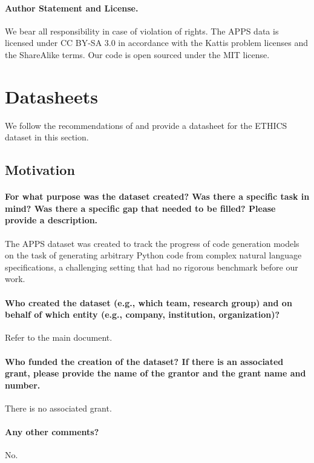 \paragraph{Author Statement and License.}
We bear all responsibility in case of violation of rights. The APPS data is licensed under CC BY-SA 3.0 in accordance with the Kattis problem licenses and the ShareAlike terms. Our code is open sourced under the MIT license.

\section{Datasheets}
We follow the recommendations of \citet{gebru2018datasheets} and provide a datasheet for the ETHICS dataset in this section.

\subsection{Motivation}

\paragraph{For what purpose was the dataset created? Was there a specific task
in mind? Was there a specific gap that needed to be filled? Please provide
a description.} 
The APPS dataset was created to track the progress of code generation models on the task of generating arbitrary Python code from complex natural language specifications, a challenging setting that had no rigorous benchmark before our work.

\paragraph{Who created the dataset (e.g., which team, research group) and on
behalf of which entity (e.g., company, institution, organization)?}
Refer to the main document.

\paragraph{Who funded the creation of the dataset? If there is an associated
grant, please provide the name of the grantor and the grant name and
number.}
There is no associated grant.

\paragraph{Any other comments?}
No.


